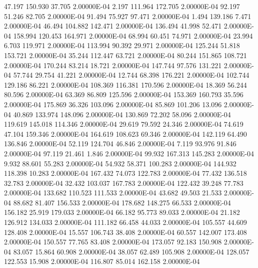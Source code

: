     47.197   150.930    37.705  2.00000E-04
     2.197   111.964   172.705  2.00000E-04
    92.197    51.246    82.705  2.00000E-04
    91.494    75.927    97.471  2.00000E-04
     1.494   139.186     7.471  2.00000E-04
    46.494   104.882   142.471  2.00000E-04
   136.494    41.998    52.471  2.00000E-04
   158.994   120.453   164.971  2.00000E-04
    68.994    60.451    74.971  2.00000E-04
    23.994     6.703   119.971  2.00000E-04
   113.994    90.392    29.971  2.00000E-04
   125.244    51.818   153.721  2.00000E-04
    35.244   112.447    63.721  2.00000E-04
    80.244   151.865   108.721  2.00000E-04
   170.244    83.214    18.721  2.00000E-04
   147.744    97.576   131.221  2.00000E-04
    57.744    29.754    41.221  2.00000E-04
    12.744    68.398   176.221  2.00000E-04
   102.744   129.186    86.221  2.00000E-04
   108.369   116.381   170.596  2.00000E-04
    18.369    56.244    80.596  2.00000E-04
    63.369    86.809   125.596  2.00000E-04
   153.369   160.793    35.596  2.00000E-04
   175.869    36.326   103.096  2.00000E-04
    85.869   101.206    13.096  2.00000E-04
    40.869   133.974   148.096  2.00000E-04
   130.869    72.202    58.096  2.00000E-04
   119.619   145.018   114.346  2.00000E-04
    29.619    79.592    24.346  2.00000E-04
    74.619    47.104   159.346  2.00000E-04
   164.619   108.623    69.346  2.00000E-04
   142.119    64.490   136.846  2.00000E-04
    52.119   124.704    46.846  2.00000E-04
     7.119    93.976    91.846  2.00000E-04
    97.119    21.461     1.846  2.00000E-04
    99.932   167.313   145.283  2.00000E-04
     9.932    88.601    55.283  2.00000E-04
    54.932    58.371   100.283  2.00000E-04
   144.932   118.398    10.283  2.00000E-04
   167.432    74.073   122.783  2.00000E-04
    77.432   136.518    32.783  2.00000E-04
    32.432   103.037   167.783  2.00000E-04
   122.432    39.248    77.783  2.00000E-04
   133.682   110.523   111.533  2.00000E-04
    43.682    49.503    21.533  2.00000E-04
    88.682    81.407   156.533  2.00000E-04
   178.682   148.275    66.533  2.00000E-04
   156.182    25.919   179.033  2.00000E-04
    66.182    95.773    89.033  2.00000E-04
    21.182   126.912   134.033  2.00000E-04
   111.182    66.458    44.033  2.00000E-04
   105.557    44.609   128.408  2.00000E-04
    15.557   106.743    38.408  2.00000E-04
    60.557   142.007   173.408  2.00000E-04
   150.557    77.765    83.408  2.00000E-04
   173.057    92.183   150.908  2.00000E-04
    83.057    15.864    60.908  2.00000E-04
    38.057    62.489   105.908  2.00000E-04
   128.057   122.553    15.908  2.00000E-04
   116.807    85.014   162.158  2.00000E-04
